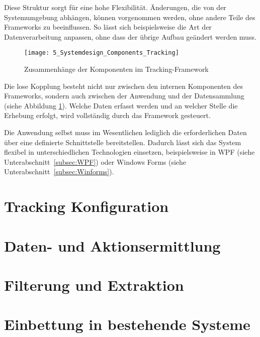 Diese Struktur sorgt für eine hohe Flexibilität. Änderungen, die von der Systemumgebung abhängen, können vorgenommen werden, ohne andere Teile des Frameworks zu beeinflussen. So lässt sich beispielsweise die Art der Datenverarbeitung anpassen, ohne dass der übrige Aufbau geändert werden muss.

\begin{figure}[H]
    \centering
    \texttt{[image: 5\_Systemdesign\_Components\_Tracking]}
    \caption{Zusammenhänge der Komponenten im Tracking-Framework}
    \label{fig:system_design_components}
\end{figure}

Die lose Kopplung besteht nicht nur zwischen den internen Komponenten des Frameworks, sondern auch zwischen der Anwendung und der Datensammlung (siehe Abbildung \ref{fig:system_design_components}). Welche Daten erfasst werden und an welcher Stelle die Erhebung erfolgt, wird vollständig durch das Framework gesteuert. 

Die Anwendung selbst muss im Wesentlichen lediglich die erforderlichen Daten über eine definierte Schnittstelle bereitstellen. Dadurch lässt sich das System flexibel in unterschiedlichen Technologien einsetzen, beispielsweise in WPF (siehe Unterabschnitt~\ref{subsec:WPF}) oder Windows Forms (siehe Unterabschnitt~\ref{subsec:Winforms}).

\section{Tracking Konfiguration}
\label{sec:configuration_concept}

\section{Daten- und Aktionsermittlung}
\label{sec:data_collection_concept}

\section{Filterung und Extraktion}
\label{sec:data_extraction_concept}

\section{Einbettung in bestehende Systeme}
\label{sec:integration_concept}


